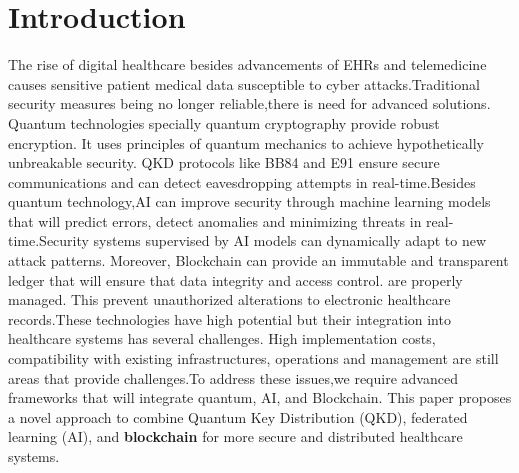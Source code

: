 \documentclass[pdflatex,sn-mathphys-num]{sn-jnl}
\theoremstyle{thmstyleone}%
\theoremstyle{thmstyletwo}%
\theoremstyle{thmstylethree}%
\begin{document}


\maketitle

\section{Introduction}
The rise of digital healthcare besides advancements of EHRs\cite{bib4} and telemedicine causes sensitive patient medical data susceptible to cyber attacks.Traditional security measures being no longer reliable,there is need for advanced solutions. Quantum technologies specially quantum cryptography provide robust encryption. It uses principles of quantum mechanics to achieve hypothetically unbreakable security. QKD protocols\cite{bib5} like BB84 and E91 ensure secure communications and can detect eavesdropping attempts in real-time.Besides quantum technology,AI can improve security through machine learning models that will predict errors, detect anomalies and minimizing threats in real-time.Security systems supervised by AI models can dynamically adapt to new attack patterns. Moreover, Blockchain can provide an immutable and transparent ledger that will ensure that data integrity and access control. are properly managed. This prevent unauthorized alterations to electronic healthcare records.These technologies have high potential but their integration into healthcare systems has several challenges. High implementation costs, compatibility with existing infrastructures, operations and management are still areas that provide challenges.To address these issues,we require advanced frameworks that will integrate quantum, AI, and Blockchain. This paper proposes a novel approach to combine Quantum Key Distribution (QKD), federated learning (AI), and \textbf{blockchain} for more secure and distributed healthcare systems.
\end{document}
